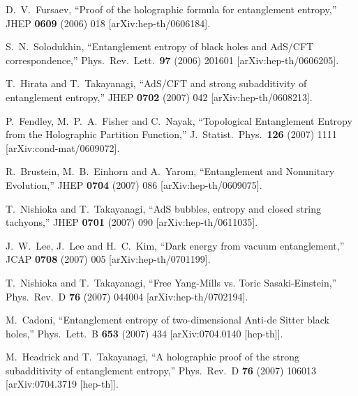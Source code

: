 \documentclass[12pt]{article}
\begin{document}
\begin{thebibliography}{99}
  D.~V.~Fursaev,
  ``Proof of the holographic formula for entanglement entropy,''
  JHEP {\bf 0609} (2006) 018
  [arXiv:hep-th/0606184].

  S.~N.~Solodukhin,
  ``Entanglement entropy of black holes and AdS/CFT correspondence,''
  Phys.\ Rev.\ Lett.\  {\bf 97} (2006) 201601
  [arXiv:hep-th/0606205].



  T.~Hirata and T.~Takayanagi,
  ``AdS/CFT and strong subadditivity of entanglement entropy,''
  JHEP {\bf 0702} (2007) 042
  [arXiv:hep-th/0608213].

  P.~Fendley, M.~P.~A.~Fisher and C.~Nayak,
  ``Topological Entanglement Entropy from the Holographic Partition Function,''
  J.\ Statist.\ Phys.\  {\bf 126} (2007) 1111
  [arXiv:cond-mat/0609072].

  R.~Brustein, M.~B.~Einhorn and A.~Yarom,
  ``Entanglement and Nonunitary Evolution,''
  JHEP {\bf 0704} (2007) 086
  [arXiv:hep-th/0609075].


  T.~Nishioka and T.~Takayanagi,
  ``AdS bubbles, entropy and closed string tachyons,''
  JHEP {\bf 0701} (2007) 090
  [arXiv:hep-th/0611035].

  J.~W.~Lee, J.~Lee and H.~C.~Kim,
  ``Dark energy from vacuum entanglement,''
  JCAP {\bf 0708} (2007) 005
  [arXiv:hep-th/0701199].

  T.~Nishioka and T.~Takayanagi,
  ``Free Yang-Mills vs. Toric Sasaki-Einstein,''
  Phys.\ Rev.\  D {\bf 76} (2007) 044004
  [arXiv:hep-th/0702194].


  M.~Cadoni,
  ``Entanglement entropy of two-dimensional Anti-de Sitter black holes,''
  Phys.\ Lett.\  B {\bf 653} (2007) 434
  [arXiv:0704.0140 [hep-th]].

  M.~Headrick and T.~Takayanagi,
  ``A holographic proof of the strong subadditivity of entanglement entropy,''
  Phys.\ Rev.\  D {\bf 76} (2007) 106013
  [arXiv:0704.3719 [hep-th]].


\end{thebibliography}
\end{document}
